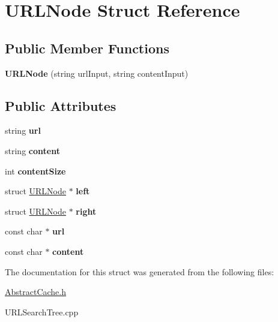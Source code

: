 \hypertarget{classURLNode}{\section{\-U\-R\-L\-Node \-Struct \-Reference}
\label{classURLNode}
}
\subsection*{\-Public \-Member \-Functions}
\begin{DoxyCompactItemize}
\item 
\hypertarget{classURLNode_a884b929b580ed24de145730114e45f01}{{\bfseries \-U\-R\-L\-Node} (string url\-Input, string content\-Input)}\label{classURLNode_a884b929b580ed24de145730114e45f01}

\end{DoxyCompactItemize}
\subsection*{\-Public \-Attributes}
\begin{DoxyCompactItemize}
\item 
\hypertarget{classURLNode_a56a91b8a8ce53f8f18eb084aa819f0b1}{string {\bfseries url}}\label{classURLNode_a56a91b8a8ce53f8f18eb084aa819f0b1}

\item 
\hypertarget{classURLNode_ab3472b86fa6d65fe261cfba0f87afac4}{string {\bfseries content}}\label{classURLNode_ab3472b86fa6d65fe261cfba0f87afac4}

\item 
\hypertarget{classURLNode_ac71b006475d8b170f19110783451c5a7}{int {\bfseries content\-Size}}\label{classURLNode_ac71b006475d8b170f19110783451c5a7}

\item 
\hypertarget{classURLNode_a8668b5a701d39dde07f171c987233343}{struct \hyperlink{classURLNode}{\-U\-R\-L\-Node} $\ast$ {\bfseries left}}\label{classURLNode_a8668b5a701d39dde07f171c987233343}

\item 
\hypertarget{classURLNode_ac7246d0b922dad7c70dc74088de96c5b}{struct \hyperlink{classURLNode}{\-U\-R\-L\-Node} $\ast$ {\bfseries right}}\label{classURLNode_ac7246d0b922dad7c70dc74088de96c5b}

\item 
\hypertarget{classURLNode_ad682feead55da0df4f4630a41bcaa025}{const char $\ast$ {\bfseries url}}\label{classURLNode_ad682feead55da0df4f4630a41bcaa025}

\item 
\hypertarget{classURLNode_aab5544f645e09fd251094437376d4397}{const char $\ast$ {\bfseries content}}\label{classURLNode_aab5544f645e09fd251094437376d4397}

\end{DoxyCompactItemize}


\-The documentation for this struct was generated from the following files\-:\begin{DoxyCompactItemize}
\item 
\hyperlink{AbstractCache_8h}{\-Abstract\-Cache.\-h}\item 
\-U\-R\-L\-Search\-Tree.\-cpp\end{DoxyCompactItemize}
